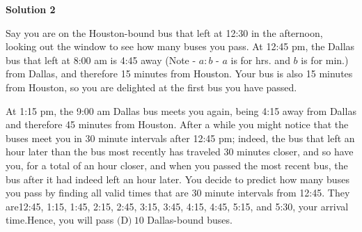 \begin{enumerate}
 



\textbf{Solution 2}

Say you are on the Houston-bound bus that left at 12:30 in the afternoon, looking out the window to see how many buses you pass. At 12:45 pm, the Dallas bus that left at 8:00 am is 4:45 away (Note - $a:b$ - $a$ is for hrs. and $b$ is for min.) from Dallas, and therefore 15 minutes from Houston. Your bus is also 15 minutes from Houston, so you are delighted at the first bus you have passed. 

 At 1:15 pm, the 9:00 am Dallas bus meets you again, being 4:15 away from Dallas and therefore 45 minutes from Houston. After a while you might notice that the buses meet you in 30 minute intervals after 12:45 pm; indeed, the bus that left an hour later than the bus most recently has traveled 30 minutes closer, and so have you, for a total of an hour closer, and when you passed the most recent bus, the bus after it had indeed left an hour later. You decide to predict how many buses you pass by finding all valid times that are 30 minute intervals from 12:45. They are12:45, 1:15, 1:45, 2:15, 2:45, 3:15, 3:45, 4:15, 4:45, 5:15, and 5:30, your arrival time.Hence, you will pass $\boxed{\text{(D)}\ 10}$ Dallas-bound buses.

 


\end{enumerate}